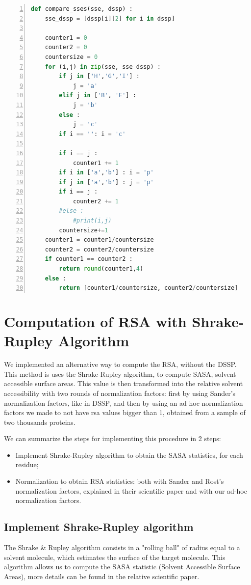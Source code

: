 \begin{lstlisting}[language=Python, caption=Procedure to compare SSEs, numbers=left]
def compare_sses(sse, dssp) :
    sse_dssp = [dssp[i][2] for i in dssp]
         
    counter1 = 0
    counter2 = 0
    countersize = 0
    for (i,j) in zip(sse, sse_dssp) :
        if j in ['H','G','I'] : 
            j = 'a'
        elif j in ['B', 'E'] : 
            j = 'b'
        else : 
            j = 'c'
        if i == '': i = 'c'
 
        if i == j :
            counter1 += 1
        if i in ['a','b'] : i = 'p'
        if j in ['a','b'] : j = 'p'
        if i == j :
            counter2 += 1
        #else :
            #print(i,j)
        countersize+=1
    counter1 = counter1/countersize
    counter2 = counter2/countersize
    if counter1 == counter2 :
        return round(counter1,4)
    else :
        return [counter1/countersize, counter2/countersize]

\end{lstlisting}
\pagebreak

\section{Computation of RSA with Shrake-Rupley Algorithm}
We implemented an alternative way to compute the RSA, without the DSSP. This method is uses the Shrake-Rupley algorithm, to compute SASA, solvent accessible surface areas. This value is then transformed into the relative solvent accessibility with two rounds of normalization factors: first by using Sander's normalization factors, like in DSSP, and then by using an ad-hoc normalization factors we made to not have rsa values bigger than 1, obtained from a sample of two thousands proteins.

We can summarize the steps for implementing this procedure in 2 steps:
\begin{itemize}
    \item Implement Shrake-Rupley algorithm to obtain the SASA statistics, for each residue;
    \item Normalization to obtain RSA statistics: both with Sander and Rost's normalization factors, explained in their scientific paper \cite{Sander-Rost} and with our ad-hoc normalization factors.
\end{itemize}

\subsection{Implement Shrake-Rupley algorithm}
The Shrake \& Rupley algorithm consists in a "rolling ball" of radius equal to a solvent molecule, which estimates the surface of the target molecule.
This algorithm allows us to compute the SASA statistic (Solvent Accessible Surface Areas), more details can be found in the relative scientific paper\cite{ShrakeRupley}.

